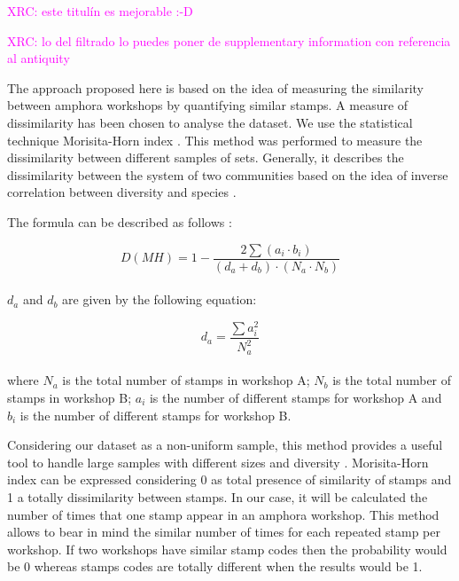 \documentclass[review]{elsarticle}
\newcommand{\memo}[2]{\textcolor{#1}{#2}}
\newcommand{\xavi}[1]{\memo{magenta}{XRC: #1\\}}
\begin{document}
\xavi{este titulín es mejorable :-D}

\xavi{lo del filtrado lo puedes poner de supplementary information con referencia al antiquity}

The approach proposed here is based on the idea of measuring the similarity between amphora workshops by quantifying similar stamps. A measure of dissimilarity has been chosen to analyse the dataset. We use the statistical technique Morisita-Horn index \citep{morisita_measuring_1959, horn_measurement_1966}. This method was performed to measure the dissimilarity between different samples of sets. Generally, it describes the dissimilarity between the system of two communities based on the idea of inverse correlation between diversity and species \citep{magurran_why_1988}.

The formula can be described as follows \citep{magurran_measuring_2013}:

\begin{equation}
D(MH) = 1- \frac{2 \sum(a_{i} \cdot b_{i})}{(d_{a} + d_{b}) \cdot (N_{a} \cdot N_{b})}
\end{equation} \\

$d_{a}$ and $d_{b}$ are given by the following equation:

\begin{equation}
d_{a} = \frac{\sum a_{i}^{2}}{N_{a}^{2}} 
\end{equation} \\

where $N_{a}$ is the total number of stamps in workshop A; $N_{b}$ is the total number of stamps in workshop B; $a_{i}$ is the number of different stamps for workshop A and $b_{i}$ is the number of different stamps for workshop B.

Considering our dataset as a non-uniform sample, this method provides a useful tool to handle large samples with different sizes and diversity \citep{wolda_similarity_1981}. Morisita-Horn index can be expressed considering 0 as total presence of similarity of stamps and 1 a totally dissimilarity between stamps. In our case, it will be calculated the number of times that one stamp appear in an amphora workshop. This method allows to bear in mind the similar number of times for each repeated stamp per workshop. If two workshops have similar stamp codes then the probability would be 0 whereas stamps codes are totally different when the results would be 1. 
\end{document}

